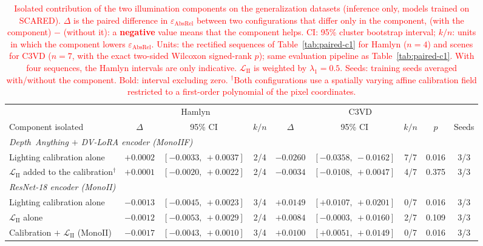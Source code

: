 \begin{table}[t]
\centering
\color{red}
\caption{\textcolor{red}{Isolated contribution of the two illumination components on the generalization datasets (inference only, models trained on SCARED). $\Delta$ is the paired difference in $\varepsilon_\textrm{AbsRel}$ between two configurations that differ only in the component, (with the component) $-$ (without it): a \textbf{negative} value means that the component helps. CI: 95\% cluster bootstrap interval; $k/n$: units in which the component lowers $\varepsilon_\textrm{AbsRel}$. Units: the rectified sequences of Table~\ref{tab:paired-c1} for Hamlyn ($n=4$) and scenes for C3VD ($n=7$, with the exact two-sided Wilcoxon signed-rank $p$); same evaluation pipeline as Table~\ref{tab:paired-c1}. With four sequences, the Hamlyn intervals are only indicative. $\mathcal{L}_\textrm{II}$ is weighted by $\lambda_1=0.5$. Seeds: training seeds averaged with/without the component. Bold: interval excluding zero. $^{\dagger}$Both configurations use a spatially varying affine calibration field restricted to a first-order polynomial of the pixel coordinates.}}
\label{tab:components-crossdomain}
\small
\setlength{\tabcolsep}{5pt}
\begin{tabular}{l rcc rccc c}
\toprule
 & \multicolumn{3}{c}{Hamlyn} & \multicolumn{4}{c}{C3VD} & \\
\cmidrule(lr){2-4}\cmidrule(lr){5-8}
Component isolated & \multicolumn{1}{c}{$\Delta$} & 95\% CI & $k/n$ & \multicolumn{1}{c}{$\Delta$} & 95\% CI & $k/n$ & $p$ & Seeds \\
\midrule
\multicolumn{9}{l}{\emph{Depth~Anything $+$ DV-LoRA encoder (MonoIIF)}} \\
\quad Lighting calibration alone & $+0.0002$ & $[-0.0033,\ +0.0037]$ & 2/4 & $\mathbf{-0.0260}$ & $[-0.0358,\ -0.0162]$ & 7/7 & 0.016 & 3/3 \\
\quad $\mathcal{L}_\textrm{II}$ added to the calibration$^{\dagger}$ & $+0.0001$ & $[-0.0020,\ +0.0022]$ & 2/4 & $-0.0034$ & $[-0.0108,\ +0.0047]$ & 4/7 & 0.375 & 3/3 \\
\midrule
\multicolumn{9}{l}{\emph{ResNet-18 encoder (MonoII)}} \\
\quad Lighting calibration alone & $-0.0013$ & $[-0.0045,\ +0.0023]$ & 3/4 & $\mathbf{+0.0149}$ & $[+0.0107,\ +0.0201]$ & 0/7 & 0.016 & 3/3 \\
\quad $\mathcal{L}_\textrm{II}$ alone & $-0.0012$ & $[-0.0053,\ +0.0029]$ & 2/4 & $+0.0084$ & $[-0.0003,\ +0.0160]$ & 2/7 & 0.109 & 3/3 \\
\quad Calibration $+$ $\mathcal{L}_\textrm{II}$ (MonoII) & $-0.0017$ & $[-0.0043,\ +0.0010]$ & 3/4 & $\mathbf{+0.0100}$ & $[+0.0051,\ +0.0149]$ & 0/7 & 0.016 & 3/3 \\
\bottomrule
\end{tabular}
\end{table}
